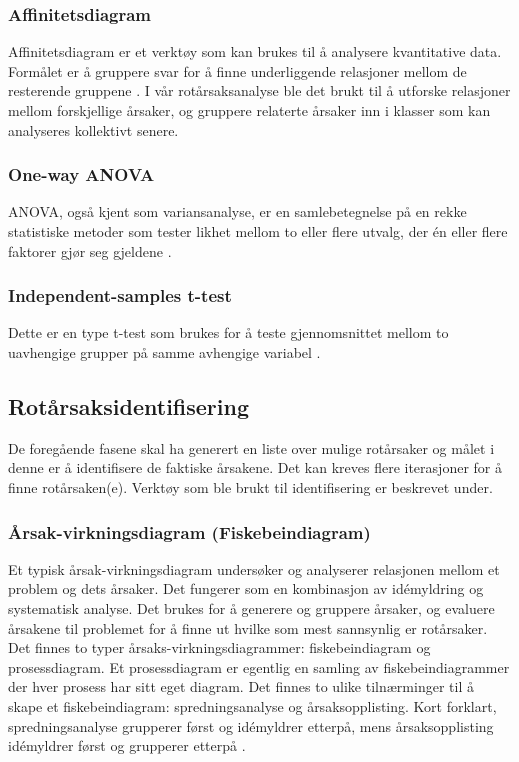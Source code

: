 \subsubsection{Affinitetsdiagram}
Affinitetsdiagram er et verktøy som kan brukes til å analysere kvantitative data. Formålet er å gruppere svar for å finne underliggende relasjoner mellom de resterende gruppene \cite{RCA}. I vår rotårsaksanalyse ble det brukt til å utforske relasjoner mellom forskjellige årsaker, og gruppere relaterte årsaker inn i klasser som kan analyseres kollektivt senere. 

\subsubsection{One-way ANOVA}
ANOVA, også kjent som variansanalyse, er en samlebetegnelse på en rekke statistiske metoder som tester likhet mellom to eller flere utvalg, der én eller flere faktorer gjør seg gjeldene \cite{ANOVA}. 

\subsubsection{Independent-samples t-test}
Dette er en type t-test som brukes for å teste gjennomsnittet mellom to uavhengige grupper på samme avhengige variabel \cite{t-test}. 

\subsection{Rotårsaksidentifisering}
De foregående fasene skal ha generert en liste over mulige rotårsaker og målet i denne er å identifisere de faktiske årsakene. Det kan kreves flere iterasjoner for å finne rotårsaken(e). Verktøy som ble brukt til identifisering er beskrevet under. 

\subsubsection{Årsak-virkningsdiagram (Fiskebeindiagram)}
Et typisk årsak-virkningsdiagram undersøker og analyserer relasjonen mellom et problem og dets årsaker. Det fungerer som en kombinasjon av idémyldring og systematisk analyse. Det brukes for å generere og gruppere årsaker, og evaluere årsakene til problemet for å finne ut hvilke som mest sannsynlig er rotårsaker. Det finnes to typer årsaks-virkningsdiagrammer: fiskebeindiagram og prosessdiagram. Et prosessdiagram er egentlig en samling av fiskebeindiagrammer der hver prosess har sitt eget diagram. Det finnes to ulike tilnærminger til å skape et fiskebeindiagram: spredningsanalyse og årsaksopplisting. Kort forklart, spredningsanalyse grupperer først og idémyldrer etterpå, mens årsaksopplisting idémyldrer først og grupperer etterpå \cite{RCA}. 

